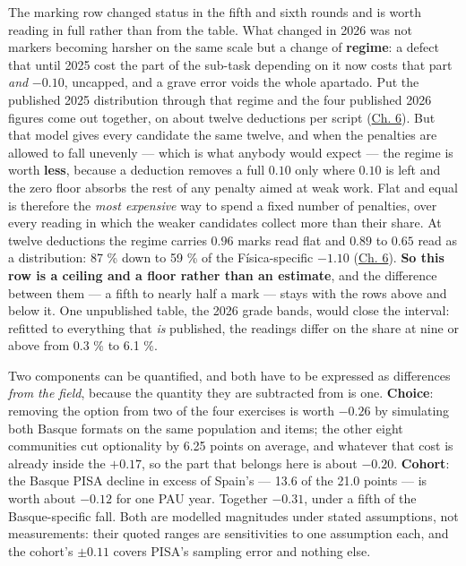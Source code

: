 \documentclass[
  10.5pt,
  a4paper,
  DIV=11,
  numbers=noendperiod]{scrartcl}
\begin{document}
The marking row changed status in the fifth and sixth rounds and is
worth reading in full rather than from the table. What changed in 2026
was not markers becoming harsher on the same scale but a change of
\textbf{regime}: a defect that until 2025 cost the part of the sub-task
depending on it now costs that part \emph{and} \(-0.10\), uncapped, and
a grave error voids the whole apartado. Put the published 2025
distribution through that regime and the four published 2026 figures
come out together, on about twelve deductions per script
(\href{06-interpretation.qmd\#penalty-regime}{Ch. 6}). But that model
gives every candidate the same twelve, and when the penalties are
allowed to fall unevenly --- which is what anybody would expect --- the
regime is worth \textbf{less}, because a deduction removes a full
\(0.10\) only where \(0.10\) is left and the zero floor absorbs the rest
of any penalty aimed at weak work. Flat and equal is therefore the
\emph{most expensive} way to spend a fixed number of penalties, over
every reading in which the weaker candidates collect more than their
share. At twelve deductions the regime carries \(0.96\) marks read flat
and \(0.89\) to \(0.65\) read as a distribution: 87 \% down to 59 \% of
the Física-specific \(-1.10\)
(\href{06-interpretation.qmd\#penalty-shape}{Ch. 6}). \textbf{So this
row is a ceiling and a floor rather than an estimate}, and the
difference between them --- a fifth to nearly half a mark --- stays with
the rows above and below it. One unpublished table, the 2026 grade
bands, would close the interval: refitted to everything that \emph{is}
published, the readings differ on the share at nine or above from 0.3 \%
to 6.1 \%.

Two components can be quantified, and both have to be expressed as
differences \emph{from the field}, because the quantity they are
subtracted from is one. \textbf{Choice}: removing the option from two of
the four exercises is worth \(-0.26\) by simulating both Basque formats
on the same population and items; the other eight communities cut
optionality by 6.25 points on average, and whatever that cost is already
inside the \(+0.17\), so the part that belongs here is about
\textbf{\(-0.20\)}. \textbf{Cohort}: the Basque PISA decline in excess
of Spain's --- 13.6 of the 21.0 points --- is worth about
\textbf{\(-0.12\)} for one PAU year. Together \textbf{\(-0.31\)}, under
a fifth of the Basque-specific fall. Both are modelled magnitudes under
stated assumptions, not measurements: their quoted ranges are
sensitivities to one assumption each, and the cohort's \(\pm 0.11\)
covers PISA's sampling error and nothing else.
\end{document}

